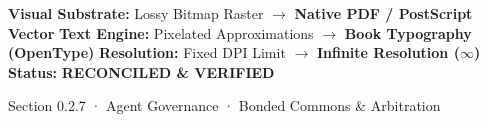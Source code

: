 \documentclass[10pt,a4paper,landscape]{article}
\begin{document}
\vspace*{0.05cm}
\noindent
\begin{tcolorbox}[
  colback=hhpaper,colframe=hhgray!35,arc=1.5pt,boxrule=0.4pt,
  top=1.5pt,bottom=1.5pt,left=6pt,right=6pt
]
  \pdgrotesk\scriptsize
  \noindent
  \textbf{Visual Substrate:} Lossy Bitmap Raster $\rightarrow$ \textbf{\color{pdcobalt}Native PDF / PostScript Vector}\hfill
  \textbf{Text Engine:} Pixelated Approximations $\rightarrow$ \textbf{\color{pdcobalt}Book Typography (OpenType)}\hfill
  \textbf{Resolution:} Fixed DPI Limit $\rightarrow$ \textbf{\color{pdcobalt}Infinite Resolution ($\infty$)}\hfill
  \textbf{Status:} \textbf{\color{pdteal}RECONCILED \& VERIFIED}
\end{tcolorbox}
\clearpage

\noindent
\begin{minipage}[t]{\linewidth}
  \hfill
  {\pdgrotesk\footnotesize\color{hhgray} Section 0.2.7 · Agent Governance · Bonded Commons \& Arbitration}\\
  \vspace*{0.03cm}
  \noindent{\color{hhgray!40}\rule{\linewidth}{0.5pt}}
\end{minipage}
\end{document}
